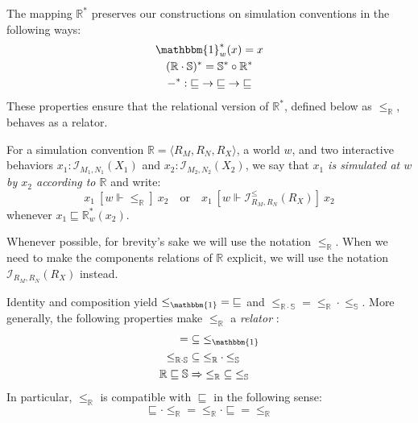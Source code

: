 \documentclass[acmsmall,timestamp,review]{acmart}
\newcommand{\ifr}[1]{\ [{#1}]\ }
\begin{document}
The mapping $\mathbb{R}^*$ preserves our constructions
on simulation conventions in the following ways:
\begin{gather*}
\mathbbm{1}^*_w(x) = x \\
(\mathbb{R} \cdot \mathbb{S})^* = \mathbb{S}^* \circ \mathbb{R}^* \\
-^* : {\sqsubseteq} \rightarrow {\sqsubseteq} \rightarrow {\sqsubseteq}
\end{gather*}
These properties ensure that
the relational version of $\mathbb{R}^*$,
defined below as $\le_\mathbb{R}$,
behaves as a relator.

\begin{definition}
For a simulation convention $\mathbb{R} = \langle R_M, R_N, R_X \rangle$,
a world $w$,
and two interactive behaviors
$x_1 : \mathcal{I}_{M_1, N_1}(X_1)$ and
$x_2 : \mathcal{I}_{M_2, N_2}(X_2)$,
we say that
\emph{$x_1$ is simulated at $w$ by $x_2$ according to $\mathbb{R}$}
and write:
\[
    x_1 \ifr{w \Vdash {\le}_\mathbb{R}} x_2
    \quad \mbox{or} \quad
    x_1 \ifr{w \Vdash \mathcal{I}^\le_{R_M,R_N}(R_X)} x_2
\]
whenever $x_1 \sqsubseteq \mathbb{R}^*_w(x_2)$.
\end{definition}

Whenever possible,
for brevity's sake we will use the notation $\le_\mathbb{R}$.
When we need to make the components relations of $\mathbb{R}$ explicit,
we will use the notation $\mathcal{I}_{R_M,R_N}(R_X)$ instead.

Identity and composition yield
${\le}_\mathbbm{1} = {\sqsubseteq}$ and
${\le}_{\mathbb{R} \cdot \mathbb{S}} =
 {\le}_\mathbb{R} \cdot {\le}_\mathbb{S}$.
More generally,
the following properties make
$\le_\mathbb{R}$ a \emph{relator} \cite{something}:
\begin{align*}
  {=} &\subseteq {\le}_\mathbbm{1} \\
  {\le}_{\mathbb{R} \cdot \mathbb{S}} &\subseteq
    {\le}_\mathbb{R} \cdot {\le}_\mathbb{S} \\
  \mathbb{R} \sqsubseteq \mathbb{S} &\Rightarrow
    {\le}_\mathbb{R} \subseteq {\le}_\mathbb{S}
\end{align*}
In particular, $\le_\mathbb{R}$ is compatible with $\sqsubseteq$
in the following sense:
\[
    {\sqsubseteq} \cdot {\le}_\mathbb{R} =
    {\le}_\mathbb{R} \cdot {\sqsubseteq} =
    {\le}_\mathbb{R}
\]
\end{document}
